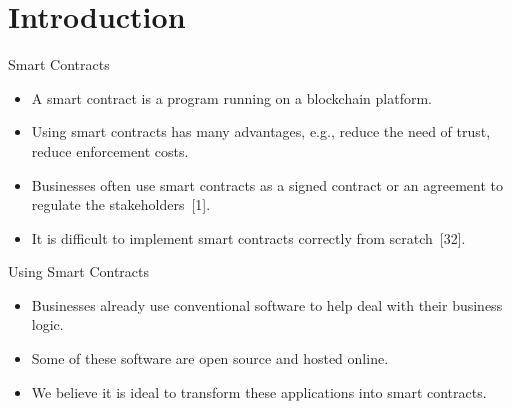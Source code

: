 \documentclass[xcolor=svgnames]{beamer}
\begin{document}
\section{Introduction}
\begin{frame}{Smart Contracts}
\begin{itemize}
\item A smart contract is a program running on a blockchain platform.
\item Using smart contracts has many advantages, e.g., reduce the need of trust, reduce enforcement costs.
\item Businesses often use smart contracts as a signed contract or an agreement to regulate the stakeholders~[1].
\item<2-> It is difficult to implement smart contracts correctly from scratch~[32].
\end{itemize}
\end{frame}

\begin{frame}{Using Smart Contracts}

\begin{itemize}
\item Businesses already use conventional software to help deal with their business logic.
\item Some of these software are open source and hosted online.
\item We believe it is ideal to transform these applications into smart contracts.
\end{itemize}

\end{frame}
\end{document}
